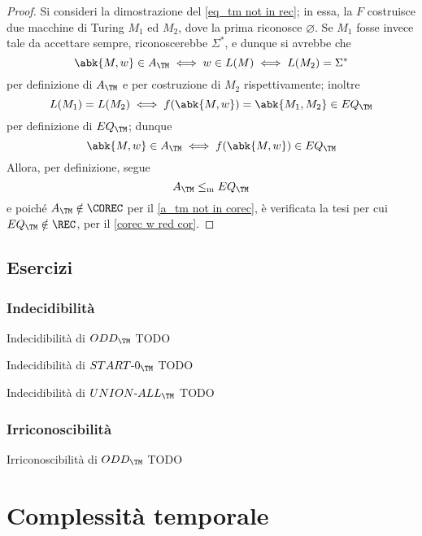 \documentclass[a4paper, 12pt]{report}
\begin{document}
    \begin{proof}
        Si consideri la dimostrazione del \cref{eq_tm not in rec}; in essa, la \TM $F$ costruisce due macchine di Turing $M_1$ ed $M_2$, dove la prima riconosce $\varnothing$. Se $M_1$ fosse invece tale da accettare sempre, riconoscerebbe $\Sigma^*$, e dunque si avrebbe che $$\abk{M, w} \in A_\TM \iff w \in L(M) \iff L(M_2) = \Sigma^*$$ per definizione di $A_\TM$ e per costruzione di $M_2$ rispettivamente; inoltre $$L(M_1)=L(M_2) \iff f(\abk{M, w}) = \abk{M_1, M_2} \in EQ_\TM$$ per definizione di $EQ_\TM$; dunque $$\abk{M, w} \in A_\TM \iff f(\abk{M, w}) \in EQ_\TM$$ Allora, per definizione, segue $$A_\TM \leq_\mathrm m EQ_\TM$$ e poiché $A_\TM \notin \COREC$ per il \cref{a_tm not in corec}, è verificata la tesi per cui $EQ_\TM \notin \REC$, per il \cref{corec w red cor}.
    \end{proof}

    \section{Esercizi}

    \subsection{Indecidibilità}
    
    \begin{framedprob}{Indecidibilità di $ODD_\TM$}
        TODO
    \end{framedprob}

    \begin{framedprob}{Indecidibilità di $START \textsf -0_\TM$}
        TODO
    \end{framedprob}

    \begin{framedprob}{Indecidibilità di $UNION \textsf -ALL_\TM$}
        TODO
    \end{framedprob}

    \subsection{Irriconoscibilità}

    \begin{framedprob}{Irriconoscibilità di $ODD_\TM$}
        TODO
    \end{framedprob}

    \chapter{Complessità temporale}
\end{document}
